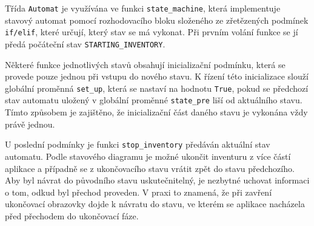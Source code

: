 
Třída \texttt{Automat} je využívána ve funkci \texttt{state\_machine}, která implementuje stavový automat pomocí rozhodovacího bloku složeného ze zřetězených podmínek \texttt{if/elif}, které určují, který stav se má vykonat. Při prvním volání funkce se jí předá počáteční stav \texttt{STARTING\_INVENTORY}. 

Některé funkce jednotlivých stavů obsahují inicializační podmínku, která se provede pouze jednou při vstupu do nového stavu. K řízení této inicializace slouží globální proměnná \texttt{set\_up}, která se nastaví na hodnotu \texttt{True}, pokud se předchozí stav automatu uložený v globální proměnné \texttt{state\_pre} liší od aktuálního stavu. Tímto způsobem je zajištěno, že inicializační část daného stavu je vykonána vždy právě jednou.





U poslední podmínky je funkci \texttt{stop\_inventory} předáván aktuální stav automatu. Podle stavového diagramu je možné ukončit inventuru z více částí aplikace a případně se z ukončovacího stavu vrátit zpět do stavu předchozího. Aby byl návrat do původního stavu uskutečnitelný, je nezbytné uchovat informaci o tom, odkud byl přechod proveden. V praxi to znamená, že při zavření ukončovací obrazovky dojde k návratu do stavu, ve kterém se aplikace nacházela před přechodem do ukončovací fáze.

